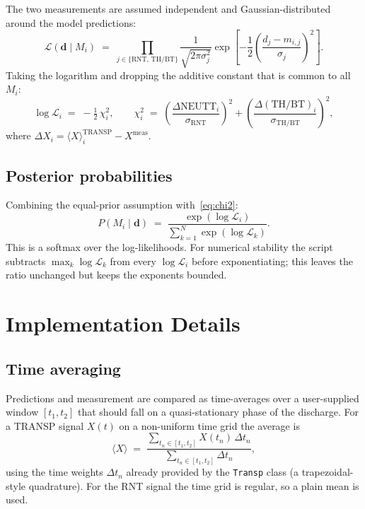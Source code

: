 \documentclass[11pt,a4paper]{article}
\begin{document}
The two measurements are assumed independent and Gaussian-distributed
around the model predictions:
\begin{equation}
    \mathcal{L}(\mathbf{d} \mid M_i)
      \;=\;
      \prod_{j \in \{\text{RNT},\,\text{TH/BT}\}}
      \frac{1}{\sqrt{2\pi \sigma_j^2}}
      \exp\!\left[
          -\frac{1}{2} \left( \frac{d_j - m_{i,j}}{\sigma_j} \right)^{\!2}
      \right].
\end{equation}
Taking the logarithm and dropping the additive constant that is common to
all $M_i$:
\begin{equation}
    \log \mathcal{L}_i \;=\; -\tfrac{1}{2}\,\chi_i^2,
    \qquad
    \chi_i^2 \;=\;
        \left( \frac{\Delta\text{NEUTT}_i}{\sigma_{\text{RNT}}} \right)^{\!2}
        +
        \left( \frac{\Delta(\text{TH/BT})_i}{\sigma_{\text{TH/BT}}} \right)^{\!2},
    \label{eq:chi2}
\end{equation}
where $\Delta X_i = \langle X \rangle_i^{\text{TRANSP}} - X^{\text{meas}}$.

\subsection{Posterior probabilities}

Combining the equal-prior assumption with~\eqref{eq:chi2}:
\begin{equation}
    P(M_i \mid \mathbf{d})
      \;=\;
      \frac{\exp(\log \mathcal{L}_i)}
           {\sum_{k=1}^{N} \exp(\log \mathcal{L}_k)}.
    \label{eq:posterior}
\end{equation}
This is a softmax over the log-likelihoods. For numerical stability the
script subtracts $\max_k \log \mathcal{L}_k$ from every $\log \mathcal{L}_i$
before exponentiating; this leaves the ratio unchanged but keeps the
exponents bounded.

\section{Implementation Details}

\subsection{Time averaging}

Predictions and measurement are compared as time-averages over a
user-supplied window $[t_1, t_2]$ that should fall on a quasi-stationary
phase of the discharge. For a TRANSP signal $X(t)$ on a non-uniform
time grid the average is
\begin{equation}
    \langle X \rangle
      \;=\;
      \frac{\sum_{t_n \in [t_1, t_2]} X(t_n)\, \Delta t_n}
           {\sum_{t_n \in [t_1, t_2]} \Delta t_n},
\end{equation}
using the time weights $\Delta t_n$ already provided by the
\texttt{Transp} class (a trapezoidal-style quadrature). For the RNT signal
the time grid is regular, so a plain mean is used.
\end{document}
